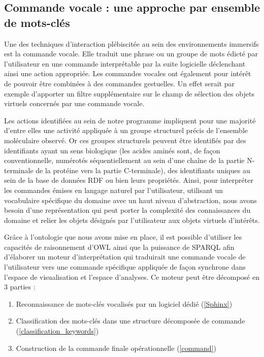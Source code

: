 \subsection{Commande vocale : une approche par ensemble de mots-clés}

Une des techniques d'interaction plébiscitée au sein des environnements immersifs est la commande vocale. Elle traduit une phrase ou un groupe de mots édicté par l'utilisateur en une commande interprétable par la suite logicielle déclenchant ainsi une action appropriée. Les commandes vocales ont également pour intérêt de pouvoir être combinées à des commandes gestuelles. Un effet serait par exemple d'apporter un filtre supplémentaire sur le champ de sélection des objets virtuels concernés par une commande vocale.

Les actions identifiées au sein de notre programme impliquent pour une majorité d'entre elles une activité appliquée à un groupe structurel précis de l'ensemble moléculaire observé. Or ces groupes structurels peuvent être identifiés par des identifiants ayant un sens biologique (les acides aminés sont, de façon conventionnelle, numérotés séquentiellement au sein d'une chaîne de la partie N-terminale de la protéine vers la partie C-terminale), des identifiants uniques au sein de la base de données RDF ou bien leurs propriétés. Ainsi, pour interpréter les commandes émises en langage naturel par l'utilisateur, utilisant un vocabulaire spécifique du domaine avec un haut niveau d'abstraction, nous avons besoin d'une représentation qui peut porter la complexité des connaissances du domaine et relier les objets désignés par l'utilisateur aux objets virtuels d'intérêts.

Grâce à l'ontologie que nous avons mise en place, il est possible d'utiliser les capacités de raisonnement d'OWL ainsi que la puissance de SPARQL afin d'élaborer un moteur d'interprétation qui traduirait une commande vocale de l'utilisateur vers une commande spécifique appliquée de façon synchrone dans l'espace de visualisation et l'espace d'analyses.
Ce moteur peut être décomposé en 3 parties :

\begin{enumerate}
  \item Reconnaissance de mots-clés vocalisés par un logiciel dédié (\ref{Sphinx})
  \item Classification des mots-clés dans une structure décomposée de commande (\ref{classification_keywords})
  \item Construction de la commande finale opérationnelle (\ref{command})
\end{enumerate}

